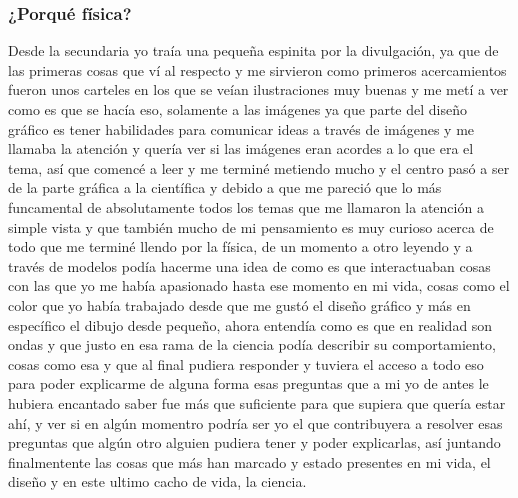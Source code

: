 \documentclass[letterpaper, 12pt]{article}
\begin{document}
        \subsubsection*{¿Porqué física?}
        Desde la secundaria yo traía una pequeña espinita por la divulgación, ya que de las primeras cosas que ví al respecto y me sirvieron como primeros acercamientos fueron unos carteles en los que se veían ilustraciones muy buenas y me metí a ver como es que se hacía eso, solamente a las imágenes ya que parte del diseño gráfico es tener habilidades para comunicar ideas a través de imágenes y me llamaba la atención %
        y quería ver si las imágenes eran acordes a lo que era el tema, así que comencé a leer y me terminé metiendo mucho y el centro pasó a ser de la parte gráfica a la científica %
        y debido a que me pareció que lo más funcamental de absolutamente todos los temas que me llamaron la atención a simple vista %
        y que también mucho de mi pensamiento es muy curioso acerca de todo que me terminé llendo por la física, %
        de un momento a otro leyendo y a través de modelos podía hacerme una idea de como es que interactuaban cosas con las que yo me había apasionado hasta ese momento en mi vida, cosas como el color que yo había trabajado desde que me gustó el diseño gráfico y más en específico el dibujo desde pequeño, ahora entendía como es que en realidad son ondas y que justo en esa rama de la ciencia podía describir su comportamiento, cosas como esa y que al final pudiera responder y tuviera el acceso a todo eso para poder explicarme de alguna forma esas preguntas que a mi yo de antes le hubiera encantado saber fue más que suficiente para que supiera que quería estar ahí, y ver si en algún momentro podría ser yo el que contribuyera a resolver esas preguntas que algún otro alguien pudiera tener y poder explicarlas, así juntando finalmentente las cosas que más han marcado y estado presentes en mi vida, el diseño y en este ultimo cacho de vida, la ciencia.
    
\end{document}
